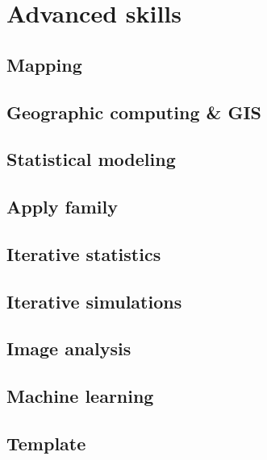 \documentclass[
]{book}
\begin{document}
\hypertarget{part-advanced-skills}{%
\part{Advanced skills}\label{part-advanced-skills}}

\hypertarget{mapping}{%
\chapter{Mapping}\label{mapping}}

\hypertarget{geographic-computing-gis}{%
\chapter{Geographic computing \& GIS}\label{geographic-computing-gis}}

\hypertarget{statistical-modeling}{%
\chapter{Statistical modeling}\label{statistical-modeling}}

\hypertarget{apply-family}{%
\chapter{Apply family}\label{apply-family}}

\hypertarget{iterative-statistics}{%
\chapter{Iterative statistics}\label{iterative-statistics}}

\hypertarget{iterative-simulations}{%
\chapter{Iterative simulations}\label{iterative-simulations}}

\hypertarget{image-analysis}{%
\chapter{Image analysis}\label{image-analysis}}

\hypertarget{machine-learning}{%
\chapter{Machine learning}\label{machine-learning}}

\hypertarget{template}{%
\chapter{Template}\label{template}}
\end{document}
